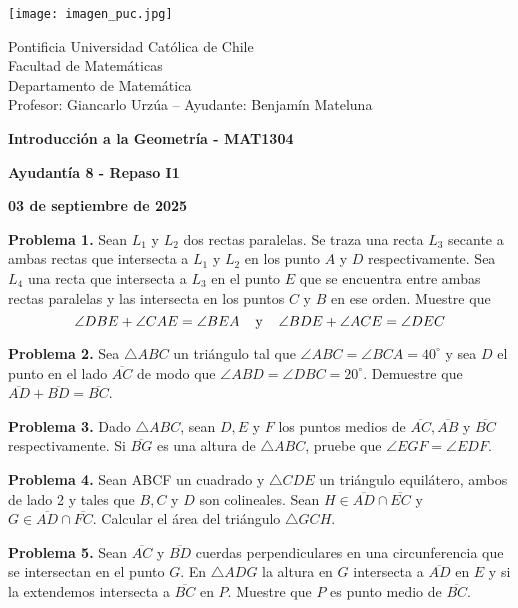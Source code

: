 \documentclass{article}
\begin{document}
\begin{minipage}{2.5cm}
    \texttt{[image: imagen\_puc.jpg]}
\end{minipage}
\begin{minipage}{14cm}
    {\sc Pontificia Universidad Católica de Chile\\
    Facultad de Matemáticas\\
    Departamento de Matemática\\
    Profesor: Giancarlo Urzúa -- Ayudante: Benjamín Mateluna}
\end{minipage}
\vspace{1ex}

{\centerline{\bf Introducción a la Geometría - MAT1304}
\centerline{\bf Ayudantía 8 - Repaso I1}}
\centerline{\bf 03 de septiembre de 2025}

\vspace{1cm}
\noindent\textbf{Problema 1.} Sean $L_{1}$ y $L_{2}$ dos rectas paralelas. Se traza una recta 
$L_{3}$ secante a ambas rectas que intersecta a $L_{1}$ y $L_{2}$ en los punto $A$ y $D$ 
respectivamente. Sea $L_{4}$ una recta que intersecta a $L_{3}$ en el punto $E$ que se encuentra 
entre ambas rectas paralelas y las intersecta en los puntos $C$ y $B$ en ese orden. Muestre que
\begin{equation*}
    \angle DBE+\angle CAE=\angle BEA \hspace{4mm}\text{y}\hspace{4mm} \angle BDE+\angle ACE=\angle DEC
\end{equation*}

\vspace{5mm}
\noindent\textbf{Problema 2.} Sea $\triangle ABC$ un triángulo tal que $\angle ABC=\angle BCA
=40^{\circ}$ y sea $D$ el punto en el lado $\overline{AC}$ de modo que $\angle ABD=\angle DBC
=20^{\circ}$. Demuestre que $\overline{AD}+\overline{BD}=\overline{BC}$.

\vspace{5mm}
\noindent\textbf{Problema 3.} Dado $\triangle ABC$, sean $D,E$ y $F$ los puntos medios de 
$\overline{AC}, \overline{AB}$ y $\overline{BC}$ respectivamente. Si $\overline{BG}$ es una altura 
de $\triangle ABC$, pruebe que $\angle EGF=\angle EDF$.

\vspace{5mm}
\noindent\textbf{Problema 4.} Sean ABCF un cuadrado y $\triangle CDE$ un triángulo equilátero,
ambos de lado 2 y tales que $B,C$ y $D$ son colineales. Sean $H\in\overline{AD}\cap\overline{EC}$ 
y $G\in\overline{AD}\cap\overline{FC}$. Calcular el área del triángulo $\triangle GCH$.

\vspace{5mm}
\noindent\textbf{Problema 5.} Sean $\overline{AC}$ y $\overline{BD}$ cuerdas perpendiculares en 
una circunferencia que se intersectan en el punto $G$. En $\triangle ADG$ la altura en $G$ 
intersecta a $\overline{AD}$ en $E$ y si la extendemos intersecta a $\overline{BC}$ en $P$. 
Muestre que $P$ es punto medio de $\overline{BC}$.
\end{document}
